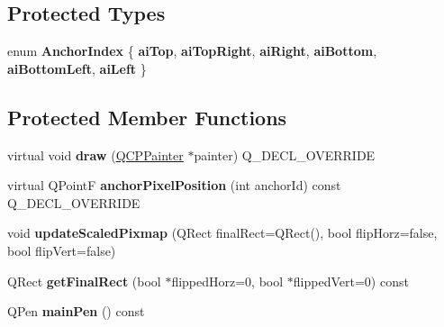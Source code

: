 \subsection*{Protected Types}
\begin{DoxyCompactItemize}
\item 
\mbox{\label{class_q_c_p_item_pixmap_a0ea7f65edb7395e02de521915f221174}} 
enum {\bfseries Anchor\+Index} \{ \newline
{\bfseries ai\+Top}, 
{\bfseries ai\+Top\+Right}, 
{\bfseries ai\+Right}, 
{\bfseries ai\+Bottom}, 
\newline
{\bfseries ai\+Bottom\+Left}, 
{\bfseries ai\+Left}
 \}
\end{DoxyCompactItemize}
\subsection*{Protected Member Functions}
\begin{DoxyCompactItemize}
\item 
\mbox{\label{class_q_c_p_item_pixmap_a9538a7d37fe20a4ff4bb2cb5bbbf2b48}} 
virtual void {\bfseries draw} (\hyperlink{class_q_c_p_painter}{Q\+C\+P\+Painter} $\ast$painter) Q\+\_\+\+D\+E\+C\+L\+\_\+\+O\+V\+E\+R\+R\+I\+DE
\item 
\mbox{\label{class_q_c_p_item_pixmap_a5803d8e173bc4d48619fc43701db32e5}} 
virtual Q\+PointF {\bfseries anchor\+Pixel\+Position} (int anchor\+Id) const Q\+\_\+\+D\+E\+C\+L\+\_\+\+O\+V\+E\+R\+R\+I\+DE
\item 
\mbox{\label{class_q_c_p_item_pixmap_a8bced3027b326b290726cd1979c7cfc6}} 
void {\bfseries update\+Scaled\+Pixmap} (Q\+Rect final\+Rect=Q\+Rect(), bool flip\+Horz=false, bool flip\+Vert=false)
\item 
\mbox{\label{class_q_c_p_item_pixmap_a4e7d803e5093c457a109f8fae56677c2}} 
Q\+Rect {\bfseries get\+Final\+Rect} (bool $\ast$flipped\+Horz=0, bool $\ast$flipped\+Vert=0) const
\item 
\mbox{\label{class_q_c_p_item_pixmap_aad6dddd67163831538d40023a98a9fe7}} 
Q\+Pen {\bfseries main\+Pen} () const
\end{DoxyCompactItemize}
